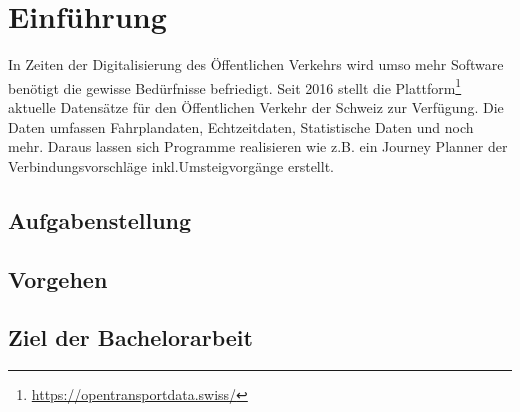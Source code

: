 \documentclass[a4paper,12pt]{scrartcl}
\begin{document}
\section{Einführung}
\label{sec:Einfuehrung}
In Zeiten der Digitalisierung des Öffentlichen Verkehrs wird umso mehr Software benötigt die gewisse Bedürfnisse befriedigt. Seit 2016 stellt die Plattform\footnote{\url{https://opentransportdata.swiss/}} aktuelle Datensätze für den Öffentlichen Verkehr der Schweiz zur Verfügung. Die Daten umfassen Fahrplandaten, Echtzeitdaten, Statistische Daten und noch mehr. Daraus lassen sich Programme realisieren wie z.B. ein Journey Planner der Verbindungsvorschläge inkl.Umsteigvorgänge erstellt. 

\subsection{Aufgabenstellung}
\label{Aufgabenstellung}




\subsection{Vorgehen}
\label{Vorgehen}

\subsection{Ziel der Bachelorarbeit}
\label{Ziel der Bachelorarbeit}
\end{document}

